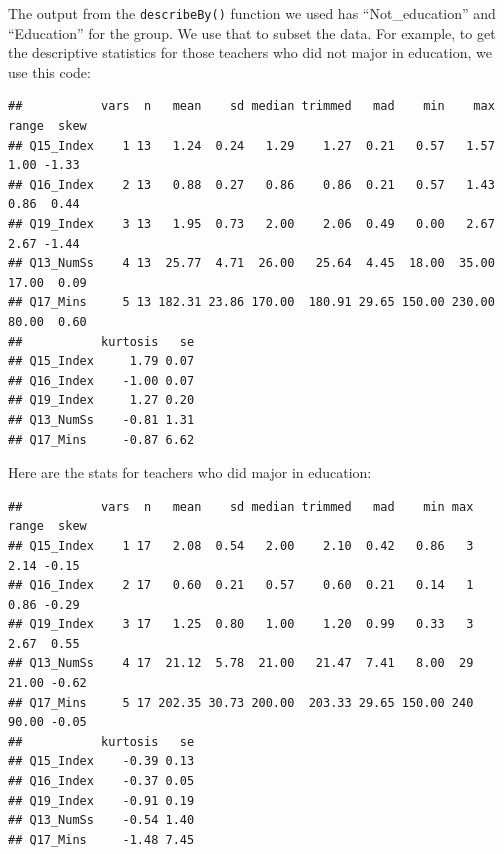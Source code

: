 \documentclass[
]{article}
\newenvironment{Shaded}{\begin{snugshade}}{\end{snugshade}}
\newcommand{\NormalTok}[1]{#1}
\newcommand{\OperatorTok}[1]{\textcolor[rgb]{0.81,0.36,0.00}{\textbf{#1}}}
\begin{document}
The output from the \texttt{describeBy()} function we used has ``Not\_education'' and ``Education'' for the group. We use that to subset the data. For example, to get the descriptive statistics for those teachers who did not major in education, we use this code:

\begin{Shaded}
\end{Shaded}

\begin{verbatim}
##           vars  n   mean    sd median trimmed   mad    min    max range  skew
## Q15_Index    1 13   1.24  0.24   1.29    1.27  0.21   0.57   1.57  1.00 -1.33
## Q16_Index    2 13   0.88  0.27   0.86    0.86  0.21   0.57   1.43  0.86  0.44
## Q19_Index    3 13   1.95  0.73   2.00    2.06  0.49   0.00   2.67  2.67 -1.44
## Q13_NumSs    4 13  25.77  4.71  26.00   25.64  4.45  18.00  35.00 17.00  0.09
## Q17_Mins     5 13 182.31 23.86 170.00  180.91 29.65 150.00 230.00 80.00  0.60
##           kurtosis   se
## Q15_Index     1.79 0.07
## Q16_Index    -1.00 0.07
## Q19_Index     1.27 0.20
## Q13_NumSs    -0.81 1.31
## Q17_Mins     -0.87 6.62
\end{verbatim}

Here are the stats for teachers who did major in education:

\begin{Shaded}
\end{Shaded}

\begin{verbatim}
##           vars  n   mean    sd median trimmed   mad    min max range  skew
## Q15_Index    1 17   2.08  0.54   2.00    2.10  0.42   0.86   3  2.14 -0.15
## Q16_Index    2 17   0.60  0.21   0.57    0.60  0.21   0.14   1  0.86 -0.29
## Q19_Index    3 17   1.25  0.80   1.00    1.20  0.99   0.33   3  2.67  0.55
## Q13_NumSs    4 17  21.12  5.78  21.00   21.47  7.41   8.00  29 21.00 -0.62
## Q17_Mins     5 17 202.35 30.73 200.00  203.33 29.65 150.00 240 90.00 -0.05
##           kurtosis   se
## Q15_Index    -0.39 0.13
## Q16_Index    -0.37 0.05
## Q19_Index    -0.91 0.19
## Q13_NumSs    -0.54 1.40
## Q17_Mins     -1.48 7.45
\end{verbatim}
\end{document}
